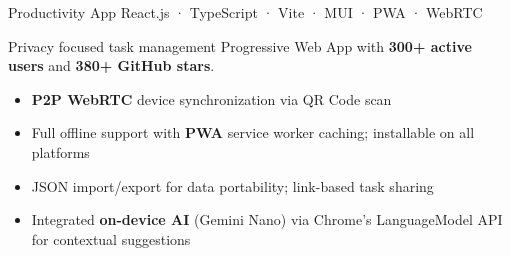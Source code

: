 \documentclass[10pt, a4paper]{article}
\begin{document}
\vspace{8pt}

\project%
  {Productivity App}%
  {React.js · TypeScript · Vite · MUI · PWA · WebRTC}%
  {%
    \dotsep%
  }

Privacy focused task management Progressive Web App with \textbf{300+ active users} and \textbf{380+ GitHub stars}.

\begin{itemize}
  \item \textbf{P2P WebRTC} device synchronization via QR Code scan
  \item Full offline support with \textbf{PWA} service worker caching; installable on all platforms
  \item JSON import/export for data portability; link-based task sharing
  \item Integrated \textbf{on-device AI} (Gemini Nano) via Chrome's LanguageModel API for contextual suggestions
\end{itemize}
\end{document}
